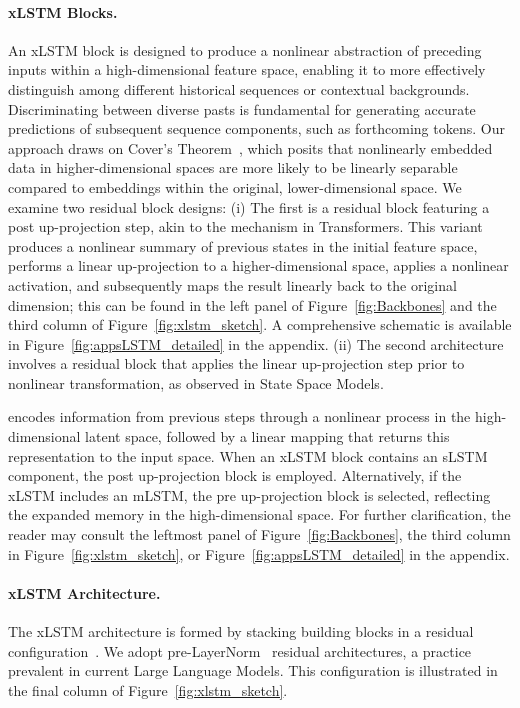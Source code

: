 \paragraph{xLSTM Blocks.}
\label{sec:xLSTMblock}
An xLSTM block is designed to produce a nonlinear abstraction of preceding inputs within a high-dimensional feature space, enabling it to more effectively distinguish among different historical sequences or contextual backgrounds. Discriminating between diverse pasts is fundamental for generating accurate predictions of subsequent sequence components, such as forthcoming tokens. Our approach draws on Cover’s Theorem~\citep{Cover:65}, which posits that nonlinearly embedded data in higher-dimensional spaces are more likely to be linearly separable compared to embeddings within the original, lower-dimensional space. We examine two residual block designs: (i) The first is a residual block featuring a post up-projection step, akin to the mechanism in Transformers. This variant produces a nonlinear summary of previous states in the initial feature space, performs a linear up-projection to a higher-dimensional space, applies a nonlinear activation, and subsequently maps the result linearly back to the original dimension; this can be found in the left panel of Figure~\ref{fig:Backbones} and the third column of Figure~\ref{fig:xlstm_sketch}. A comprehensive schematic is available in Figure~\ref{fig:appsLSTM_detailed} in the appendix. (ii) The second architecture involves a residual block that applies the linear up-projection step prior to nonlinear transformation, as observed in State Space Models.

encodes information from previous steps through a nonlinear process in the high-dimensional latent space, followed by a linear mapping that returns this representation to the input space. When an xLSTM block contains an sLSTM component, the post up-projection block is employed. Alternatively, if the xLSTM includes an mLSTM, the pre up-projection block is selected, reflecting the expanded memory in the high-dimensional space. For further clarification, the reader may consult the leftmost panel of Figure~\ref{fig:Backbones}, the third column in Figure~\ref{fig:xlstm_sketch}, or Figure~\ref{fig:appsLSTM_detailed} in the appendix.

\paragraph{xLSTM Architecture.}
\label{sec:xLSTMarchitecure}
The xLSTM architecture is formed by stacking building blocks in a residual configuration~\citep{Srivastava:15,He:16}. We adopt pre-LayerNorm~\citep{Ba:16b} residual architectures, a practice prevalent in current Large Language Models. This configuration is illustrated in the final column of Figure~\ref{fig:xlstm_sketch}.

